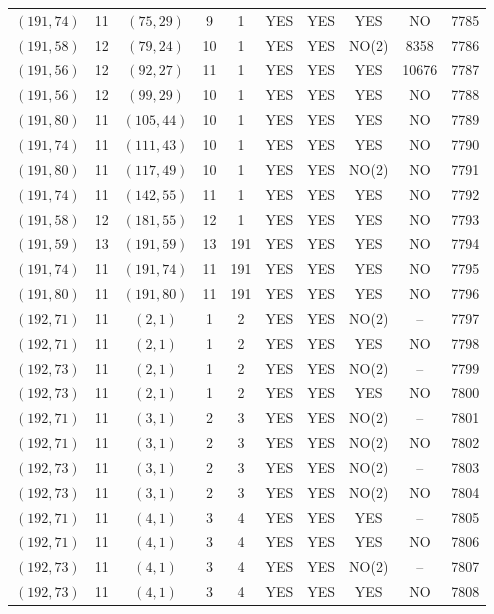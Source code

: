 \begin{longtable}{|c|c|c|c|c|c|c|c|c|c|}
$(191, 74)$ & 11 & $(75, 29)$ & 9 & 1 & YES & YES & YES & NO & 7785\\
$(191, 58)$ & 12 & $(79, 24)$ & 10 & 1 & YES & YES & NO(2) & 8358 & 7786\\
$(191, 56)$ & 12 & $(92, 27)$ & 11 & 1 & YES & YES & YES & 10676 & 7787\\
$(191, 56)$ & 12 & $(99, 29)$ & 10 & 1 & YES & YES & YES & NO & 7788\\
$(191, 80)$ & 11 & $(105, 44)$ & 10 & 1 & YES & YES & YES & NO & 7789\\
$(191, 74)$ & 11 & $(111, 43)$ & 10 & 1 & YES & YES & YES & NO & 7790\\
$(191, 80)$ & 11 & $(117, 49)$ & 10 & 1 & YES & YES & NO(2) & NO & 7791\\
$(191, 74)$ & 11 & $(142, 55)$ & 11 & 1 & YES & YES & YES & NO & 7792\\
$(191, 58)$ & 12 & $(181, 55)$ & 12 & 1 & YES & YES & YES & NO & 7793\\
$(191, 59)$ & 13 & $(191, 59)$ & 13 & 191 & YES & YES & YES & NO & 7794\\
$(191, 74)$ & 11 & $(191, 74)$ & 11 & 191 & YES & YES & YES & NO & 7795\\
$(191, 80)$ & 11 & $(191, 80)$ & 11 & 191 & YES & YES & YES & NO & 7796\\
$(192, 71)$ & 11 & $(2, 1)$ & 1 & 2 & YES & YES & NO(2) & -- & 7797\\
$(192, 71)$ & 11 & $(2, 1)$ & 1 & 2 & YES & YES & YES & NO & 7798\\
$(192, 73)$ & 11 & $(2, 1)$ & 1 & 2 & YES & YES & NO(2) & -- & 7799\\
$(192, 73)$ & 11 & $(2, 1)$ & 1 & 2 & YES & YES & YES & NO & 7800\\
$(192, 71)$ & 11 & $(3, 1)$ & 2 & 3 & YES & YES & NO(2) & -- & 7801\\
$(192, 71)$ & 11 & $(3, 1)$ & 2 & 3 & YES & YES & NO(2) & NO & 7802\\
$(192, 73)$ & 11 & $(3, 1)$ & 2 & 3 & YES & YES & NO(2) & -- & 7803\\
$(192, 73)$ & 11 & $(3, 1)$ & 2 & 3 & YES & YES & NO(2) & NO & 7804\\
$(192, 71)$ & 11 & $(4, 1)$ & 3 & 4 & YES & YES & YES & -- & 7805\\
$(192, 71)$ & 11 & $(4, 1)$ & 3 & 4 & YES & YES & YES & NO & 7806\\
$(192, 73)$ & 11 & $(4, 1)$ & 3 & 4 & YES & YES & NO(2) & -- & 7807\\
$(192, 73)$ & 11 & $(4, 1)$ & 3 & 4 & YES & YES & YES & NO & 7808\\

\end{longtable}
